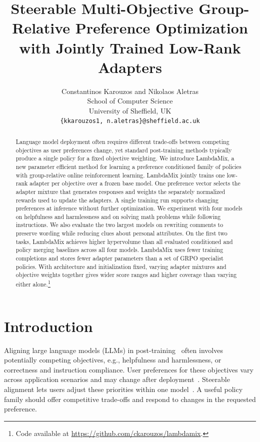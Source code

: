 \documentclass{article} %
\title{Steerable Multi-Objective Group-Relative Preference Optimization with Jointly Trained Low-Rank Adapters}
\author{Constantinos Karouzos  and  Nikolaos Aletras
\\[1em]
School of Computer Science \\
University of Sheffield, UK \\
\texttt{\{kkarouzos1, n.aletras\}@sheffield.ac.uk}
}
\begin{document}
\maketitle

\begin{abstract}
Language model deployment often requires different trade-offs between competing objectives as user preferences change, yet standard post-training methods typically produce a single policy for a fixed objective weighting. We introduce LambdaMix, a new parameter efficient method for learning a preference conditioned family of policies with group-relative online reinforcement learning. LambdaMix jointly trains one low-rank adapter per objective over a frozen base model. One preference vector selects the adapter mixture that generates responses and weights the separately normalized rewards used to update the adapters. A single training run supports changing preferences at inference without further optimization. We experiment with four models on helpfulness and harmlessness and on solving math problems while following instructions. We also evaluate the two largest models on rewriting comments to preserve wording while reducing clues about personal attributes. On the first two tasks, LambdaMix achieves higher hypervolume than all evaluated conditioned and policy merging baselines across all four models. LambdaMix uses fewer training completions and stores fewer adapter parameters than a set of GRPO specialist policies. With architecture and initialization fixed, varying adapter mixtures and objective weights together gives wider score ranges and higher coverage than varying either alone.\footnote{Code available at \url{https://github.com/ckarouzos/lambdamix}.}
\end{abstract}

\section{Introduction}

Aligning large language models (LLMs) in post-training~\citep{ouyang2022training,rafailov2023direct, shao2024deepseekmath} often involves potentially competing objectives, e.g., helpfulness and harmlessness, or correctness and instruction compliance. User preferences for these objectives vary across application scenarios and may change after deployment~\citep{dai2024saferlhf,chakraborty2024maxmin}. Steerable alignment lets users adjust these priorities within one model~\citep{wang-etal-2024-conditional}. A useful policy family should offer competitive trade-offs and respond to changes in the requested preference.
\end{document}
